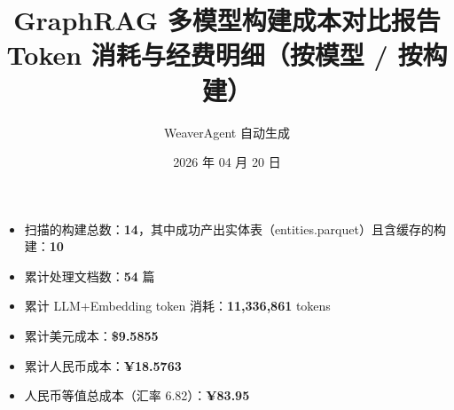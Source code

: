 \documentclass[11pt]{article}
\title{\vspace{-1cm}\Huge\textbf{GraphRAG 多模型构建成本对比报告}\\[4pt]\large Token 消耗与经费明细（按模型 / 按构建）}
\author{WeaverAgent 自动生成}
\date{2026 年 04 月 20 日}
\begin{document}
\maketitle
\thispagestyle{fancy}
\begin{tcolorbox}[colback=rowalt, colframe=headerbg, title=\textbf{执行摘要}, breakable]
\begin{itemize}[leftmargin=*]
  \item 扫描的构建总数：\textbf{14}，其中成功产出实体表（entities.parquet）且含缓存的构建：\textbf{10}
  \item 累计处理文档数：\textbf{54} 篇
  \item 累计 LLM+Embedding token 消耗：\textbf{11{,}336{,}861} tokens
  \item 累计美元成本：\textbf{\$9.5855}
  \item 累计人民币成本：\textbf{¥18.5763}
  \item 人民币等值总成本（汇率 6.82）：\textbf{¥83.95}
\end{itemize}
\end{tcolorbox}
\end{document}
